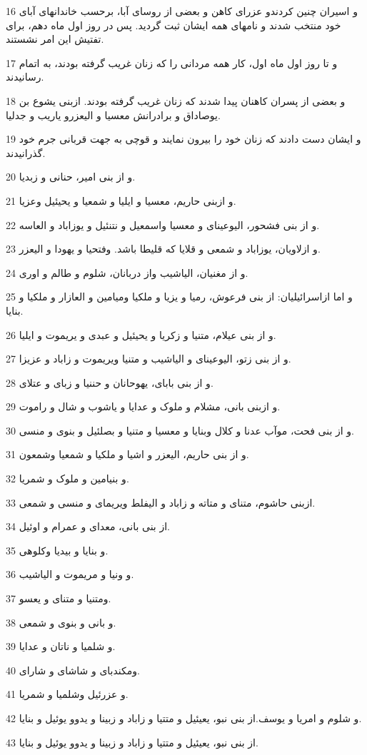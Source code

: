 \par 16 و اسیران چنین کردندو عزرای کاهن و بعضی از روسای آبا، برحسب خاندانهای آبای خود منتخب شدند و نامهای همه ایشان ثبت گردید. پس در روز اول ماه دهم، برای تفتیش این امر نشستند.
\par 17 و تا روز اول ماه اول، کار همه مردانی را که زنان غریب گرفته بودند، به اتمام رسانیدند.
\par 18 و بعضی از پسران کاهنان پیدا شدند که زنان غریب گرفته بودند. ازبنی یشوع بن یوصاداق و برادرانش معسیا و الیعزرو یاریب و جدلیا.
\par 19 و ایشان دست دادند که زنان خود را بیرون نمایند و قوچی به جهت قربانی جرم خود گذرانیدند.
\par 20 و از بنی امیر، حنانی و زبدیا.
\par 21 و ازبنی حاریم، معسیا و ایلیا و شمعیا و یحیئیل وعزیا.
\par 22 و از بنی فشحور، الیوعینای و معسیا واسمعیل و نتنئیل و یوزاباد و العاسه.
\par 23 و ازلاویان، یوزاباد و شمعی و قلایا که قلیطا باشد. وفتحیا و یهودا و الیعزر.
\par 24 و از مغنیان، الیاشیب واز دربانان، شلوم و طالم و اوری.
\par 25 و اما ازاسرائیلیان: از بنی فرعوش، رمیا و یزیا و ملکیا ومیامین و العازار و ملکیا و بنایا.
\par 26 و از بنی عیلام، متنیا و زکریا و یحیئیل و عبدی و یریموت و ایلیا.
\par 27 و از بنی زتو، الیوعینای و الیاشیب و متنیا ویریموت و زاباد و عزیزا.
\par 28 و از بنی بابای، یهوحانان و حننیا و زبای و عتلای.
\par 29 و ازبنی بانی، مشلام و ملوک و عدایا و یاشوب و شال و راموت.
\par 30 و از بنی فحت، موآب عدنا و کلال وبنایا و معسیا و متنیا و بصلئیل و بنوی و منسی.
\par 31 و از بنی حاریم، الیعزر و اشیا و ملکیا و شمعیا وشمعون.
\par 32 و بنیامین و ملوک و شمریا.
\par 33 ازبنی حاشوم، متنای و متاته و زاباد و الیفلط ویریمای و منسی و شمعی.
\par 34 از بنی بانی، معدای و عمرام و اوئیل.
\par 35 و بنایا و بیدیا وکلوهی.
\par 36 و ونیا و مریموت و الیاشیب.
\par 37 ومتنیا و متنای و یعسو.
\par 38 و بانی و بنوی و شمعی.
\par 39 و شلمیا و ناتان و عدایا.
\par 40 ومکندبای و شاشای و شارای.
\par 41 و عزرئیل وشلمیا و شمریا.
\par 42 و شلوم و امریا و یوسف.از بنی نبو، یعیئیل و متتیا و زاباد و زبینا و یدوو یوئیل و بنایا.
\par 43 از بنی نبو، یعیئیل و متتیا و زاباد و زبینا و یدوو یوئیل و بنایا.


